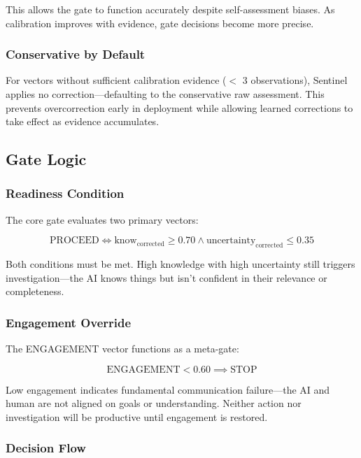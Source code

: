 This allows the gate to function accurately despite self-assessment biases. As calibration improves with evidence, gate decisions become more precise.

\subsubsection{Conservative by Default}

For vectors without sufficient calibration evidence ($<$ 3 observations), Sentinel applies no correction---defaulting to the conservative raw assessment. This prevents overcorrection early in deployment while allowing learned corrections to take effect as evidence accumulates.

\subsection{Gate Logic}

\subsubsection{Readiness Condition}

The core gate evaluates two primary vectors:

\begin{equation}
\text{PROCEED} \iff \text{know}_{\text{corrected}} \geq 0.70 \land \text{uncertainty}_{\text{corrected}} \leq 0.35
\end{equation}

Both conditions must be met. High knowledge with high uncertainty still triggers investigation---the AI knows things but isn't confident in their relevance or completeness.

\subsubsection{Engagement Override}

The ENGAGEMENT vector functions as a meta-gate:

\begin{equation}
\text{ENGAGEMENT} < 0.60 \implies \text{STOP}
\end{equation}

Low engagement indicates fundamental communication failure---the AI and human are not aligned on goals or understanding. Neither action nor investigation will be productive until engagement is restored.

\subsubsection{Decision Flow}

